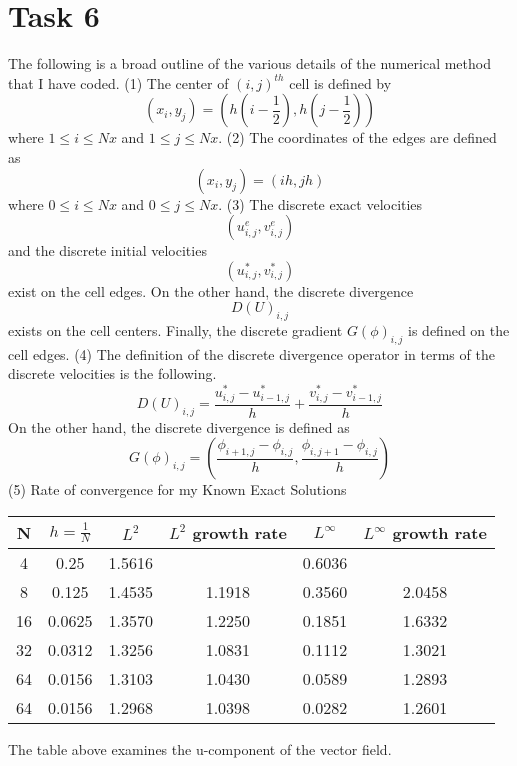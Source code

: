 \documentclass{article}
\begin{document}
\section*{Task 6}
The following is a broad outline of the various details of the 
numerical method that I have coded. 
\newline
(1) The center of $(i, j)^{th}$ cell is defined by
$$(x_i, y_j) = (h(i-\frac{1}{2}), h(j-\frac{1}{2}))$$
where
$1 \leq i \leq Nx$ and $1 \leq j \leq Nx$. 
\newline
(2) The coordinates of the edges are defined as
$$(x_i, y_j) = (ih, jh)$$
where
$0 \leq i \leq Nx$ and $0 \leq j \leq Nx$. 
\newline
(3) The discrete exact velocities
$$(u_{i, j}^e, v_{i, j}^e)$$
and the discrete initial velocities
$$(u_{i, j}^*, v_{i, j}^*)$$
exist on the cell edges.\newline
On the other hand, the discrete divergence 
$$D(U)_{i, j}$$ exists on the cell centers. 
\newline
Finally, the discrete gradient $G(\phi)_{i, j}$ 
is defined on the cell edges. 
\newline
(4) The definition of the discrete divergence operator in terms
of the discrete velocities is the following. 
$$D(U)_{i,j} = \frac{u_{i,j}^* - u_{i-1,j}^*}{h} + \frac{v_{i,j}^* - v_{i-1,j}^*}{h}$$
On the other hand, the discrete divergence is defined as
$$G(\phi)_{i,j} = (\frac{\phi_{i+1,j} -\phi_{i,j}}{h}, \frac{\phi_{i,j+1} -\phi_{i,j}}{h})$$
\newline
(5) Rate of convergence for my Known Exact Solutions
\begin{center}
    \begin{tabular}{||c c c c c c||} 
     \hline
     N & $h = \frac{1}{N}$ & $L^2$ & $L^2$ growth rate& $L^\infty$&$L^\infty$ growth rate \\ [0.5ex] 
     \hline\hline
     4 & 0.25 & 1.5616 && 0.6036& \\ 
     \hline
     8 & 0.125 & 1.4535 &1.1918& 0.3560& 2.0458\\
     \hline
     16 & 0.0625 & 1.3570 &1.2250& 0.1851& 1.6332\\
     \hline
     32 & 0.0312 & 1.3256 &1.0831& 0.1112& 1.3021\\
     \hline
     64 & 0.0156 & 1.3103 &1.0430& 0.0589& 1.2893\\  
     \hline
     64 & 0.0156 & 1.2968 &1.0398& 0.0282&  1.2601\\ [1ex] 
     \hline
    \end{tabular}
    \end{center}
The table above examines the u-component of the vector field.
\end{document}
